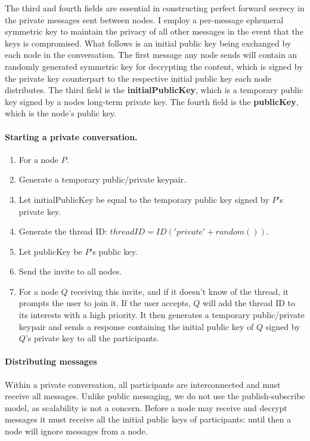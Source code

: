 \documentclass[10pt,a4paper,onecolumn]{article}
\begin{document}
The third and fourth fields are essential in constructing perfect forward secrecy in the private messages sent between nodes. I employ a per-message ephemeral symmetric key to maintain the privacy of all other messages in the event that the keys is compromised. What follows is an initial public key being exchanged by each node in the conversation. The first message any node sends will contain an randomly generated symmetric key for decrypting the content, which is signed by the private key counterpart to the respective initial public key each node distributes. The third field is the \textbf{initialPublicKey}, which is a temporary public key signed by a nodes long-term private key. The fourth field is the \textbf{publicKey}, which is the node's public key.

\paragraph*{Starting a private conversation.} 
\begin{enumerate}
\item For a node $P$.
\item Generate a temporary public/private keypair.
\item Let initialPublicKey be equal to the temporary public key signed by $P$'s private key.
\item Generate the thread ID: $threadID = ID('private'+random())$.
\item Let publicKey be $P$'s public key.
\item Send the invite to all nodes.
\item For a node $Q$ receiving this invite, and if it doesn't know of the thread, it prompts the user to join it. If the user accepts, $Q$ will add the thread ID to its interests with a high priority. It then generates a temporary public/private keypair and sends a response containing the initial public key of $Q$ signed by $Q$'s private key to all the participants. 
\end{enumerate}

\paragraph*{Distributing messages}
Within a private conversation, all participants are interconnected and must receive all messages. Unlike public messaging, we do not use the publish-subscribe model, as scalability is not a concern. Before a node may receive and decrypt messages it must receive all the initial public keys of participants: until then a node will ignore messages from a node. 
\end{document}
